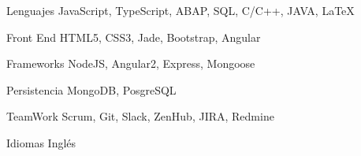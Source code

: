 


\begin{cvskills}


\cvskill
{Lenguajes} %
{JavaScript, TypeScript, ABAP, SQL, C/C++, JAVA, \LaTeX{} } %

\cvskill
{Front End} %
{HTML5, CSS3, Jade, Bootstrap, Angular} %

\cvskill
{Frameworks} %
{NodeJS, Angular2, Express, Mongoose} %


\cvskill
{Persistencia} %
{MongoDB, PosgreSQL} %

\cvskill
{TeamWork} %
{Scrum, Git, Slack, ZenHub, JIRA, Redmine} %

\cvskill
{Idiomas} %
{Inglés} %


\end{cvskills}
